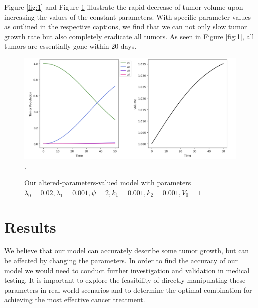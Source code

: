 \documentclass[11pt]{amsart}
\begin{document}
Figure \ref{fig:1} and Figure \ref{fig:4} illustrate the rapid decrease of tumor volume upon increasing the values of the constant parameters. With specific parameter values as outlined in the respective captions, we find that we can not only slow tumor growth rate but also completely eradicate all tumors. As seen in Figure \ref{fig:1}, all tumors are essentially gone within 20 days.

\begin{figure}[h]
\begin{center} %
\includegraphics[width=\textwidth]{altered.png}. %
\end{center}
\caption{Our altered-parameters-valued model with parameters $\lambda_0=0.02, \lambda_1=0.001, \psi=2, k_1 = 0.001, k_2=0.001, V_0 = 1$}
\label{fig:4}
\end{figure}





\section{Results}
 We believe that our model can accurately describe some tumor growth, but can be affected by changing the parameters. In order to find the accuracy of our model we would need to conduct further investigation and validation in medical testing. It is important to explore the feasibility of directly manipulating these parameters in real-world scenarios and to determine the optimal combination for achieving the most effective cancer treatment. 

\end{document}
